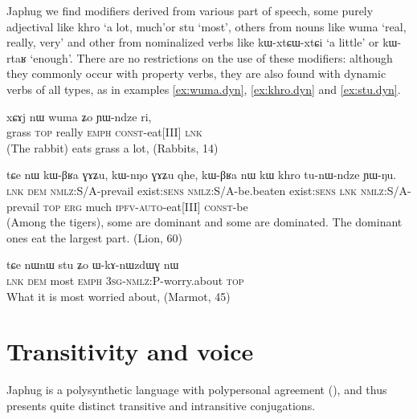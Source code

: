 \documentclass[oldfontcommands,oneside,a4paper,11pt]{article}
\newcommand{\ipa}[1]{{\phon \mbox{#1}}} %
\begin{document}
Japhug we find modifiers derived from various part of speech, some purely adjectival like \ipa{khro} `a lot, much'or \ipa{stu} `most', others from nouns like \ipa{wuma} `real, really, very' and other from nominalized verbs like  \ipa{kɯ-xtɕɯ-xtɕi} `a little' or \ipa{kɯ-rtaʁ} `enough'. There are no restrictions on the use of these modifiers: although they  commonly occur with property verbs, they are also found with dynamic verbs of all types, as in examples  \ref{ex:wuma.dyn}, \ref{ex:khro.dyn} and \ref{ex:stu.dyn}.

\begin{exe}
\ex \label{ex:wuma.dyn}
\gll
\ipa{xɕɤj} 	\ipa{nɯ} 	\ipa{wuma} 	\ipa{ʑo} 	\ipa{ɲɯ-ndze} 	\ipa{ri,} \\
grass \textsc{top} really \textsc{emph} \textsc{const}-eat[III] \textsc{lnk} \\
\glt (The rabbit) eats grass a lot,   (Rabbits, 14)
\end{exe}
\begin{exe}
\ex \label{ex:khro.dyn}
\gll
\ipa{tɕe} 	\ipa{nɯ} 	\ipa{kɯ-βʁa} 	\ipa{ɣɤʑu,} 	\ipa{kɯ-nŋo} 	\ipa{ɣɤʑu} 	\ipa{qhe,} 	\ipa{kɯ-βʁa} 	\ipa{nɯ} 	\ipa{kɯ} 	\ipa{khro} 	\ipa{tu-nɯ-ndze} 	\ipa{ɲɯ-ŋu.} 	\\
\textsc{lnk} \textsc{dem} \textsc{nmlz}:S/A-prevail exist:\textsc{sens} \textsc{nmlz}:S/A-be.beaten exist:\textsc{sens} \textsc{lnk} \textsc{nmlz}:S/A-prevail \textsc{top} \textsc{erg} much \textsc{ipfv-auto}-eat[III] \textsc{const}-be \\
\glt (Among the tigers), some are dominant and some are dominated. The dominant ones eat the largest part. (Lion, 60)
\end{exe}
\begin{exe}
\ex \label{ex:stu.dyn}
\gll
\ipa{tɕe} 	\ipa{nɯnɯ} 	\ipa{stu} 	\ipa{ʑo} 	\ipa{ɯ-kɤ-nɯzdɯɣ} 	\ipa{nɯ} \\
\textsc{lnk} \textsc{dem} most \textsc{emph} \textsc{3sg-nmlz}:P-worry.about \textsc{top} \\
\glt What it is most worried about, (Marmot, 45)
\end{exe}



\section{Transitivity and voice}


Japhug is a polysynthetic language with polypersonal agreement (\citealt{jacques10inverse}), and thus presents quite distinct transitive and intransitive conjugations.
\end{document}
